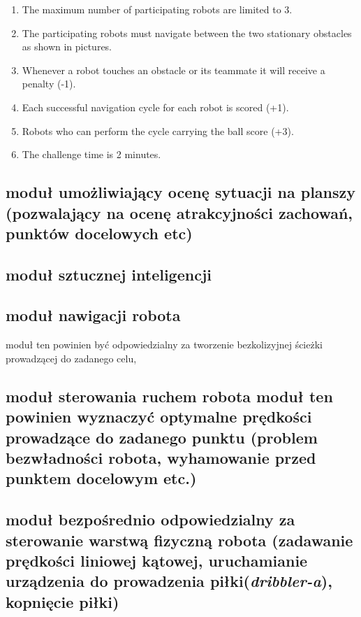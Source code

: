 \documentclass[11pt,onecolumn,a4paper,final]{article}
\begin{document}
\begin{enumerate}
\item The maximum number of participating robots are limited to 3.

\item The participating robots must navigate between the two stationary obstacles as shown in pictures.

\item Whenever a robot touches an obstacle or its teammate it will receive a penalty (-1).

\item Each successful navigation cycle for each robot is scored (+1).

\item Robots who can perform the cycle carrying the ball score (+3).

\item The challenge time is 2 minutes. 
\end{enumerate}

  \subsection*{ moduł umożliwiający ocenę sytuacji na planszy (pozwalający na ocenę atrakcyjności zachowań, punktów docelowych etc) }
  \subsection*{ moduł sztucznej inteligencji }
  \subsection*{ moduł nawigacji robota} 
  moduł ten powinien być odpowiedzialny za tworzenie bezkolizyjnej ścieżki prowadzącej do zadanego celu,
  \subsection*{ moduł sterowania ruchem robota
  moduł ten powinien wyznaczyć optymalne prędkości prowadzące do zadanego punktu (problem bezwładności robota,
  wyhamowanie przed punktem docelowym etc.) }
  \subsection*{moduł bezpośrednio odpowiedzialny za sterowanie warstwą fizyczną robota (zadawanie prędkości liniowej kątowej, uruchamianie urządzenia do prowadzenia 
  piłki(\textit{dribbler-a}), kopnięcie piłki) }
\end{document}
